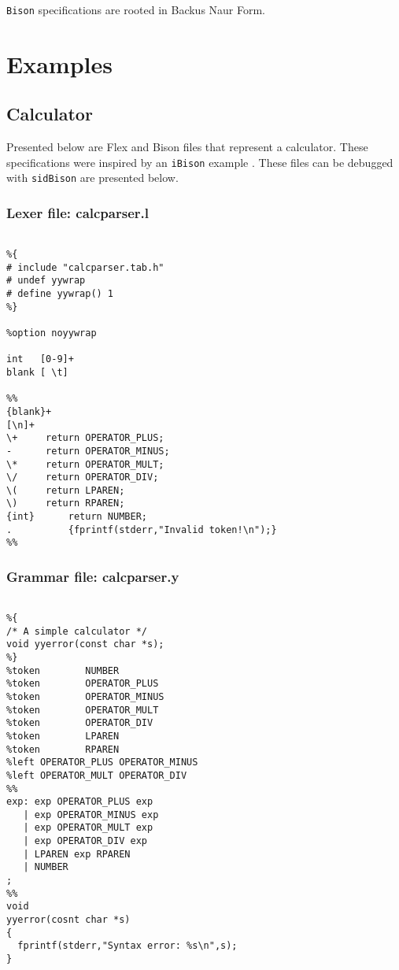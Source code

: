 \begin{appendices}
\verb|Bison| specifications are rooted in Backus Naur Form.





\chapter{Examples}

\section{Calculator}
\label{appendix:calculator}
Presented below are Flex and Bison files that represent a calculator.  These specifications were inspired by an \verb|iBison| example \cite{iBison}. These files can be debugged with \verb|sidBison| are presented below.

\subsection{Lexer file: calcparser.l}

\begin{Verbatim}[frame=single]

%{                                            
# include "calcparser.tab.h"
# undef yywrap
# define yywrap() 1
%}

%option noyywrap

int   [0-9]+
blank [ \t]

%%
{blank}+
[\n]+      
\+	   return OPERATOR_PLUS;
-	   return OPERATOR_MINUS;
\*	   return OPERATOR_MULT;
\/	   return OPERATOR_DIV;
\(	   return LPAREN;
\)	   return RPAREN;
{int}      return NUMBER;
.          {fprintf(stderr,"Invalid token!\n");}
%%

\end{Verbatim}

\subsection{Grammar file: calcparser.y}

\begin{Verbatim}[frame=single]

%{
/* A simple calculator */
void yyerror(const char *s);
%}
%token        NUMBER
%token 	      OPERATOR_PLUS
%token	      OPERATOR_MINUS
%token	      OPERATOR_MULT
%token 	      OPERATOR_DIV
%token	      LPAREN
%token 	      RPAREN
%left OPERATOR_PLUS OPERATOR_MINUS
%left OPERATOR_MULT OPERATOR_DIV
%%
exp: exp OPERATOR_PLUS exp
   | exp OPERATOR_MINUS exp
   | exp OPERATOR_MULT exp 
   | exp OPERATOR_DIV exp
   | LPAREN exp RPAREN
   | NUMBER
;
%%
void
yyerror(cosnt char *s)
{
  fprintf(stderr,"Syntax error: %s\n",s);
}


\end{Verbatim}
\end{appendices}

